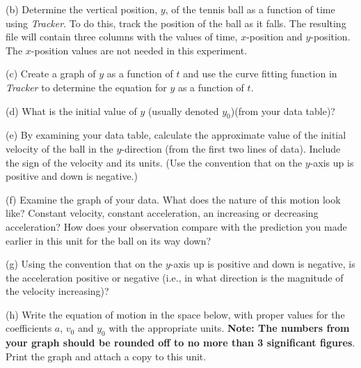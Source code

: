 (b) Determine the vertical position, $y$, of the tennis ball as a function of time using \textit{Tracker}. 
To do this, track the position of the ball as it falls. The resulting file will contain three columns with the values of time, $x$-position and $y$-position. The $x$-position values are not needed in this experiment.
\vspace{5mm}

(c) Create a graph of $y$ as a function of $t$ and use the curve fitting function in \textit{Tracker} to determine the equation for $y$ as a function of $t$.
\vspace{5mm}

(d) What is the initial value of $y$ (usually denoted \( y_{0} \))(from your data table)? 
\vspace{10mm}

\newpage
(e) By examining your data table, calculate the approximate value of the initial velocity of the ball in the $y$-direction (from the first two lines of data). Include the sign of the velocity and its units. (Use the convention that on the $y$-axis up is positive and down is negative.)
\vspace{20mm}

(f) Examine the graph of your data. What does the nature of this motion look
like? Constant velocity, constant acceleration, an increasing or decreasing
acceleration? How does your observation compare with the prediction you made
earlier in this unit for the ball on its way down?
\vspace{20mm}

(g) Using the convention that on the $y$-axis up is positive and down is negative, is the acceleration positive or negative (i.e., in what direction is the magnitude of the velocity increasing)?
\vspace{20mm}

(h) Write the equation of motion in the space below, with proper values for the coefficients 
$a$, \( v_{0} \) and \( y_{0} \) with the appropriate units. \textbf{Note: The numbers from 
your graph should be rounded off to no more than 3 significant figures}. Print the graph and 
attach a copy to this unit. 

